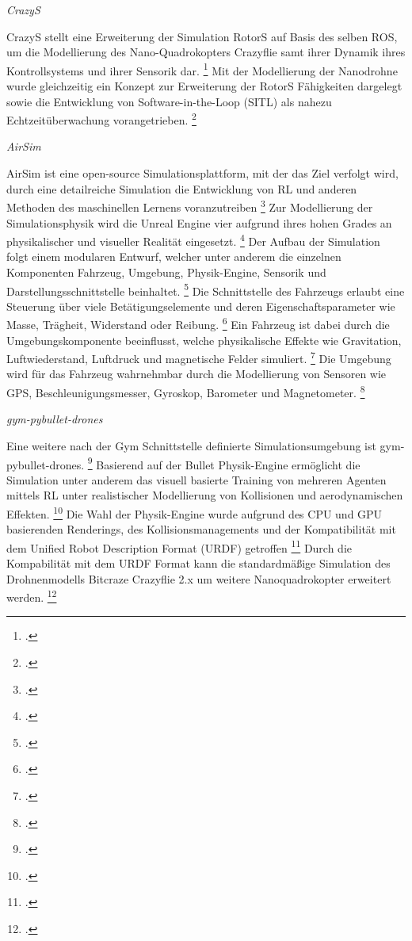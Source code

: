 \textit{CrazyS}

CrazyS stellt eine Erweiterung der Simulation RotorS auf Basis des selben ROS, um die Modellierung des Nano-Quadrokopters Crazyflie samt ihrer Dynamik ihres Kontrollsystems und ihrer Sensorik dar. \footcite[Vgl.][S. 81]{Silano.2020}
Mit der Modellierung der Nanodrohne wurde gleichzeitig ein Konzept zur Erweiterung der RotorS Fähigkeiten dargelegt sowie die Entwicklung von Software-in-the-Loop (SITL) als nahezu Echtzeitüberwachung vorangetrieben. \footcite[Vgl.][S. 82]{Silano.2020}

\textit{AirSim}

AirSim ist eine open-source Simulationsplattform, mit der das Ziel verfolgt wird, durch eine detailreiche Simulation die Entwicklung von RL und anderen Methoden des maschinellen Lernens voranzutreiben \footcite[Vgl.][S. 2]{Shah.2017}
Zur Modellierung der Simulationsphysik wird die Unreal Engine vier aufgrund ihres hohen Grades an physikalischer und visueller Realität eingesetzt. \footcite[Vgl.][S. 1]{Shah.2017}
Der Aufbau der Simulation folgt einem modularen Entwurf, welcher unter anderem die einzelnen Komponenten Fahrzeug, Umgebung, Physik-Engine, Sensorik und Darstellungsschnittstelle beinhaltet. \footcite[Vgl.][S. 3]{Shah.2017}
Die Schnittstelle des Fahrzeugs erlaubt eine Steuerung über viele Betätigungselemente und deren Eigenschaftsparameter wie Masse, Trägheit, Widerstand oder Reibung. \footcite[Vgl.][S. 5]{Shah.2017}
Ein Fahrzeug ist dabei durch die Umgebungskomponente beeinflusst, welche physikalische Effekte wie Gravitation, Luftwiederstand, Luftdruck und magnetische Felder simuliert. \footcite[Vgl.][S. 6]{Shah.2017}
Die Umgebung wird für das Fahrzeug wahrnehmbar durch die Modellierung von Sensoren wie GPS, Beschleunigungsmesser, Gyroskop, Barometer und Magnetometer. \footcite[Vgl.][S. 9]{Shah.2017}

\textit{gym-pybullet-drones}

Eine weitere nach der Gym Schnittstelle definierte Simulationsumgebung ist gym-pybullet-drones. \footcite[Vgl.][S. 1]{Panerati.332021}
Basierend auf der Bullet Physik-Engine ermöglicht die Simulation unter anderem das visuell basierte Training von mehreren Agenten mittels RL unter realistischer Modellierung von Kollisionen und aerodynamischen Effekten. \footcite[Vgl.][S. 1]{Panerati.332021}
Die Wahl der Physik-Engine wurde aufgrund des CPU und GPU basierenden Renderings, des Kollisionsmanagements und der Kompatibilität mit dem Unified Robot Description Format (URDF) getroffen \footcite[Vgl.][S. 3]{Panerati.332021}
Durch die Kompabilität mit dem URDF Format kann die standardmäßige Simulation des Drohnenmodells Bitcraze Crazyflie 2.x um weitere Nanoquadrokopter erweitert werden. \footcite[Vgl.][S. 3]{Panerati.332021}